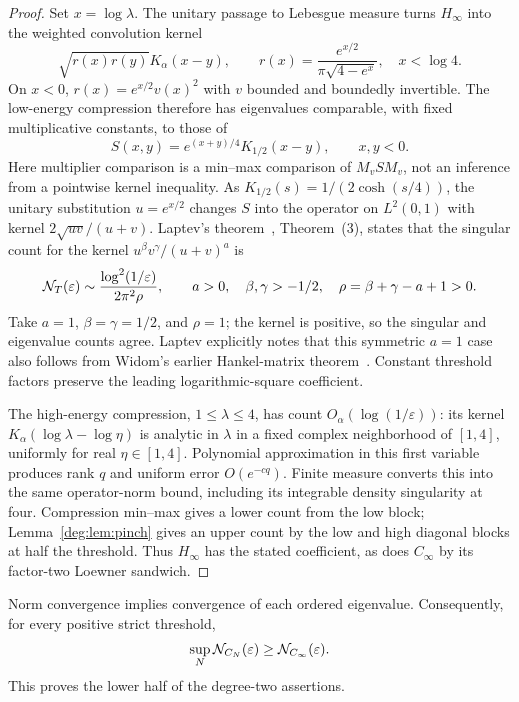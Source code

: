 \begin{proof}
Set $x=\log\lambda$. The unitary passage to Lebesgue measure turns
$H_\infty$ into the weighted convolution kernel
\[
 \sqrt{r(x)r(y)}K_\alpha(x-y),\qquad
 r(x)=\frac{e^{x/2}}{\pi\sqrt{4-e^x}},\quad x<\log4.
\]
On $x<0$, $r(x)=e^{x/2}v(x)^2$ with $v$ bounded and boundedly
invertible. The low-energy compression therefore has eigenvalues
comparable, with fixed multiplicative constants, to those of
\[
 S(x,y)=e^{(x+y)/4}K_{1/2}(x-y),\qquad x,y<0.
\]
Here multiplier comparison is a min--max comparison of
$M_vSM_v$, not an inference from a pointwise kernel inequality.
As $K_{1/2}(s)=1/(2\cosh(s/4))$, the unitary substitution
$u=e^{x/2}$ changes $S$ into the operator on $L^2(0,1)$ with kernel
$2\sqrt{uv}/(u+v)$.
Laptev's theorem~\cite{Laptev}, Theorem~(3), states that the singular
count for the kernel $u^\beta v^\gamma/(u+v)^a$ is
\[
 \mathcal N_T(\varepsilon)\sim
 \frac{\log^2(1/\varepsilon)}{2\pi^2\rho},\qquad
 a>0,\quad\beta,\gamma>-1/2,\quad\rho=\beta+\gamma-a+1>0.
\]
Take $a=1$, $\beta=\gamma=1/2$, and $\rho=1$; the kernel is positive,
so the singular and eigenvalue counts agree. Laptev explicitly notes that
this symmetric $a=1$ case also follows from Widom's earlier Hankel-matrix
theorem~\cite[p.~1039]{Laptev}. Constant threshold factors
preserve the leading logarithmic-square coefficient.

The high-energy compression, $1\le\lambda\le4$, has count
$O_\alpha(\log(1/\varepsilon))$: its kernel
$K_\alpha(\log\lambda-\log\eta)$ is analytic in $\lambda$ in a fixed
complex neighborhood of $[1,4]$, uniformly for real $\eta\in[1,4]$.
Polynomial approximation in this first variable produces rank $q$
and uniform error $O(e^{-cq})$. Finite measure converts this into the
same operator-norm bound, including its integrable density singularity
at four. Compression min--max gives a lower count from the low block;
Lemma~\ref{deg:lem:pinch} gives an upper count by the low and high diagonal
blocks at half the threshold. Thus $H_\infty$ has the stated coefficient,
as does $C_\infty$ by its factor-two Loewner sandwich.
\end{proof}

Norm convergence implies convergence of each ordered eigenvalue.
Consequently, for every positive strict threshold,
\[
 \sup_N\mathcal N_{C_N}(\varepsilon)\ge\mathcal N_{C_\infty}(\varepsilon).
\]
This proves the lower half of the degree-two assertions.

